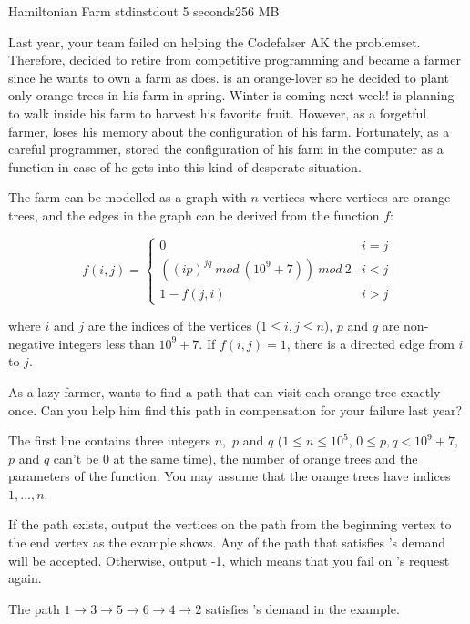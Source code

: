 \begin{problem}{Hamiltonian Farm}
{stdin}{stdout}
{5 seconds}{256 MB}{}

Last year, your team failed on helping the Codefalser \Suzukaze  AK the problemset. Therefore, \Suzukaze decided to retire from competitive programming and became a farmer since he wants to own a farm as \pittoresque does. \Suzukaze is an orange-lover so he decided to plant only orange trees in his farm in spring. Winter is coming next week! \Suzukaze is planning to walk inside his farm to harvest his favorite fruit. However, as a forgetful farmer, \Suzukaze loses his memory about the configuration of his farm. Fortunately, as a careful programmer, \Suzukaze stored the configuration of his farm in the computer as a function in case of he gets into this kind of desperate situation.
\par
The farm can be modelled as a graph with $n$ vertices where vertices are orange trees, and the edges in the graph can be derived from the function $f$:

$$f(i,j)=
\begin{cases}
0& \text{$i=j$}\\
((ip)^{jq}\ mod\ (10^{9}+7))\ mod\ 2& \text{$i<j$}\\
1-f(j,i)& \text{$i>j$}
\end{cases}$$

where $i$ and $j$ are the indices of the vertices ($1\leq i,j\leq n$), $p$ and $q$ are non-negative integers less than $10^{9}+7$. If $f(i,j)=1$, there is a directed edge from $i$ to $j$.

\par
As a lazy farmer, \Suzukaze wants to find a path that can visit each orange tree exactly once. Can you help him find this path in compensation for your failure last year?

\InputFile

The first line contains three integers $n$,\ $p$ and $q$ ($1 \leq n \leq 10^{5}$, $0 \leq p,q < 10^{9}+7,$ $p$ and $q$ can't be 0 at the same time), the number of orange trees and the parameters of the function. You may assume that the orange trees have indices $1, ..., n$.

\OutputFile

If the path exists, output the vertices on the path from the beginning vertex to the end vertex as the example shows. Any of the path that satisfies \Suzukaze 's demand will be accepted. Otherwise, output -1, which means that you fail on \Suzukaze 's request again.

\Examples

\begin{example}
%
\end{example}

\Explanation 
The path $1\xrightarrow{}3\xrightarrow{}5\xrightarrow{}6\xrightarrow{}4\xrightarrow{}2$ satisfies \Suzukaze's demand in the example.

\end{problem}
